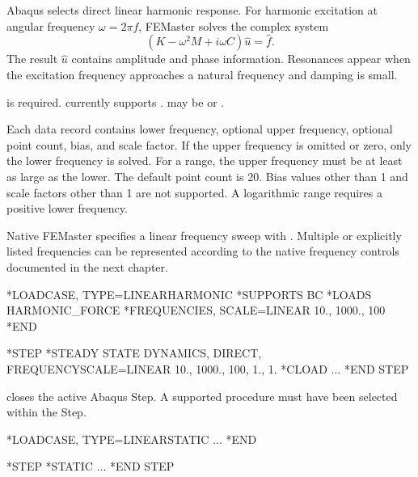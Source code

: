 
Abaqus  selects direct linear harmonic response. For harmonic excitation at angular frequency \(\omega=2\pi f\), FEMaster solves the complex system
\[
\left(K-\omega^2M+i\omega C\right)\hat u=\hat f.
\]
The result \(\hat u\) contains amplitude and phase information. Resonances appear when the excitation frequency approaches a natural frequency and damping is small.

 is required.  currently supports .  may be  or .

Each data record contains lower frequency, optional upper frequency, optional point count, bias, and scale factor. If the upper frequency is omitted or zero, only the lower frequency is solved. For a range, the upper frequency must be at least as large as the lower. The default point count is 20. Bias values other than 1 and scale factors other than 1 are not supported. A logarithmic range requires a positive lower frequency.

Native FEMaster specifies a linear frequency sweep with . Multiple or explicitly listed frequencies can be represented according to the native frequency controls documented in the next chapter.

\exampleheading

\begin{dialectexamples}
\begin{femasterdeck}
*LOADCASE, TYPE=LINEARHARMONIC
*SUPPORTS
BC
*LOADS
HARMONIC_FORCE
*FREQUENCIES, SCALE=LINEAR
10., 1000., 100
*END
\end{femasterdeck}
\begin{abaqusdeck}
*STEP
*STEADY STATE DYNAMICS, DIRECT,
 FREQUENCYSCALE=LINEAR
10., 1000., 100, 1., 1.
*CLOAD
...
*END STEP
\end{abaqusdeck}
\end{dialectexamples}


 closes the active Abaqus Step. A supported procedure must have been selected within the Step.

\exampleheading

\begin{dialectexamples}
\begin{femasterdeck}
*LOADCASE, TYPE=LINEARSTATIC
...
*END
\end{femasterdeck}
\begin{abaqusdeck}
*STEP
*STATIC
...
*END STEP
\end{abaqusdeck}
\end{dialectexamples}
